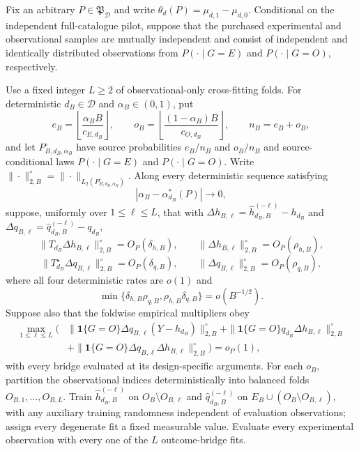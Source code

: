 Fix an arbitrary \(P\in\mathfrak P_{\mathcal D}\) and write \(\theta_d(P)=\mu_{d,1}-\mu_{d,0}\). Conditional on the independent full-catalogue pilot, suppose that the purchased experimental and observational samples are mutually independent and consist of independent and identically distributed observations from \(P(\cdot\mid G=E)\) and \(P(\cdot\mid G=O)\), respectively.

Use a fixed integer \(L\ge2\) of observational-only cross-fitting folds. For deterministic \(d_B\in\mathcal D\) and \(\alpha_B\in(0,1)\), put
\[
 e_B=\left\lfloor\frac{\alpha_BB}{c_{E,d_B}}\right\rfloor,
 \qquad
 o_B=\left\lfloor\frac{(1-\alpha_B)B}{c_{O,d_B}}\right\rfloor,
 \qquad n_B=e_B+o_B,
\]
and let \(P_{B,d_B,\alpha_B}^{\circ}\) have source probabilities \(e_B/n_B\) and \(o_B/n_B\) and source-conditional laws \(P(\cdot\mid G=E)\) and \(P(\cdot\mid G=O)\). Write \(\|\cdot\|_{2,B}^{\circ}=\|\cdot\|_{L_2(P_{B,d_B,\alpha_B}^{\circ})}\). Along every deterministic sequence satisfying
\[
 |\alpha_B-\alpha_{d_B}^*(P)|\longrightarrow0, \tag{1}
\]
suppose, uniformly over \(1\le\ell\le L\), that with \(\Delta h_{B,\ell}=\widehat h_{d_B,B}^{(-\ell)}-h_{d_B}\) and \(\Delta q_{B,\ell}=\widehat q_{d_B,B}^{(-\ell)}-q_{d_B}\),
\[
 \|T_{d_B}\Delta h_{B,\ell}\|_{2,B}^{\circ}=O_P(\delta_{h,B}),
 \qquad
 \|\Delta h_{B,\ell}\|_{2,B}^{\circ}=O_P(\rho_{h,B}), \tag{2}
\]
\[
 \|T_{d_B}^{\star}\Delta q_{B,\ell}\|_{2,B}^{\circ}=O_P(\delta_{q,B}),
 \qquad
 \|\Delta q_{B,\ell}\|_{2,B}^{\circ}=O_P(\rho_{q,B}), \tag{3}
\]
where all four deterministic rates are \(o(1)\) and
\[
 \min\{\delta_{h,B}\rho_{q,B},\rho_{h,B}\delta_{q,B}\}=o(B^{-1/2}). \tag{4}
\]
Suppose also that the foldwise empirical multipliers obey
\[
\begin{aligned}
 \max_{1\le\ell\le L}\bigl(&
 \|\mathbf 1\{G=O\}\Delta q_{B,\ell}(Y-h_{d_B})\|_{2,B}^{\circ}
 +\|\mathbf 1\{G=O\}q_{d_B}\Delta h_{B,\ell}\|_{2,B}^{\circ}\\
 &+\|\mathbf 1\{G=O\}\Delta q_{B,\ell}\Delta h_{B,\ell}\|_{2,B}^{\circ}
 \bigr)=o_P(1),
\end{aligned} \tag{5}
\]
with every bridge evaluated at its design-specific arguments. For each \(o_B\), partition the observational indices deterministically into balanced folds \(O_{B,1},\ldots,O_{B,L}\). Train \(\widehat h_{d_B,B}^{(-\ell)}\) on \(O_B\setminus O_{B,\ell}\) and \(\widehat q_{d_B,B}^{(-\ell)}\) on \(E_B\cup(O_B\setminus O_{B,\ell})\), with any auxiliary training randomness independent of evaluation observations; assign every degenerate fit a fixed measurable value. Evaluate every experimental observation with every one of the \(L\) outcome-bridge fits.

